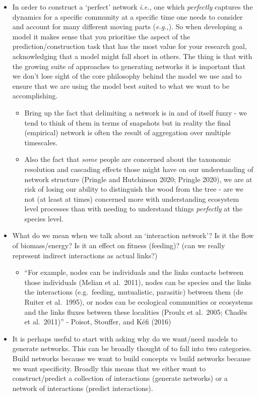 \documentclass[
  letterpaper,
  DIV=11,
  numbers=noendperiod]{scrartcl}
\providecommand{\tightlist}{%
  \setlength{\itemsep}{0pt}\setlength{\parskip}{0pt}}\usepackage{longtable,booktabs,array}
\begin{document}
\begin{itemize}
\item
  In order to construct a `perfect' network \emph{i.e.,} one which
  \emph{perfectly} captures the dynamics for a specific community at a
  specific time one needs to consider and account for many different
  moving parts (\emph{e.g.,}). So when developing a model it makes sense
  that you prioritise the aspect of the prediction/construction task
  that has the most value for your research goal, acknowledging that a
  model might fall short in others. The thing is that with the growing
  suite of approaches to generating networks it is important that we
  don't lose sight of the core philosophy behind the model we use and to
  ensure that we are using the model best suited to what we want to be
  accomplishing.

  \begin{itemize}
  \tightlist
  \item
    Bring up the fact that delimiting a network is in and of itself
    fuzzy - we tend to think of them in terms of snapshots but in
    reality the final (empirical) network is often the result of
    aggregation over multiple timescales.
  \item
    Also the fact that \emph{some} people are concerned about the
    taxonomic resolution and cascading effects those might have on our
    understanding of network structure (Pringle and Hutchinson 2020;
    Pringle 2020), we are at risk of losing our ability to distinguish
    the wood from the tree - are we not (at least at times) concerned
    more with understanding ecosystem level processes than with needing
    to understand things \emph{perfectly} at the species level.
  \end{itemize}
\item
  What do we mean when we talk about an `interaction network'? Is it the
  flow of biomass/energy? Is it an effect on fitness (feeding)? (can we
  really represent indirect interactions as actual links?)

  \begin{itemize}
  \tightlist
  \item
    ``For example, nodes can be individuals and the links contacts
    between those individuals (Melian et al.~2011), nodes can be species
    and the links the interactions (e.g.~feeding, mutualistic,
    parasitic) between them (de Ruiter et al.~1995), or nodes can be
    ecological communities or ecosystems and the links fluxes between
    these localities (Proulx et al.~2005; Chadès et al.~2011)'' -
    Poisot, Stouffer, and Kéfi (2016)
  \end{itemize}
\item
  It is perhaps useful to start with asking why do we want/need models
  to generate networks. This can be broadly thought of to fall into two
  categories. Build networks because we want to build concepts vs build
  networks because we want specificity. Broadly this means that we
  either want to construct/predict a collection of interactions
  (generate networks) or a network of interactions (predict
  interactions).


\end{itemize}
\end{document}
